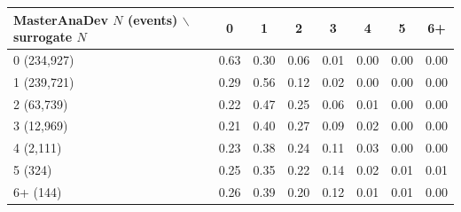 \begin{tabular}{lccccccc}
\toprule
MasterAnaDev $N$ (events) $\backslash$ surrogate $N$ & 0 & 1 & 2 & 3 & 4 & 5 & 6+ \\
\midrule
0 (234,927) & 0.63 & 0.30 & 0.06 & 0.01 & 0.00 & 0.00 & 0.00 \\
1 (239,721) & 0.29 & 0.56 & 0.12 & 0.02 & 0.00 & 0.00 & 0.00 \\
2 (63,739) & 0.22 & 0.47 & 0.25 & 0.06 & 0.01 & 0.00 & 0.00 \\
3 (12,969) & 0.21 & 0.40 & 0.27 & 0.09 & 0.02 & 0.00 & 0.00 \\
4 (2,111) & 0.23 & 0.38 & 0.24 & 0.11 & 0.03 & 0.00 & 0.00 \\
5 (324) & 0.25 & 0.35 & 0.22 & 0.14 & 0.02 & 0.01 & 0.01 \\
6+ (144) & 0.26 & 0.39 & 0.20 & 0.12 & 0.01 & 0.01 & 0.00 \\
\bottomrule
\end{tabular}
